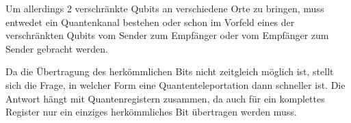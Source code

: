 Um allerdings 2 verschränkte Qubits an verschiedene Orte zu bringen, muss entwedet ein Quantenkanal bestehen oder schon im Vorfeld eines der verschränkten Qubits vom Sender zum Empfänger oder vom Empfänger zum Sender gebracht werden.

Da die Übertragung des herkömmlichen Bits nicht zeitgleich möglich ist, stellt sich die Frage, in welcher Form eine Quantenteleportation dann schneller ist. Die Antwort hängt mit Quantenregistern zusammen, da auch für ein komplettes Register nur ein einziges herkömmliches Bit übertragen werden muss.

